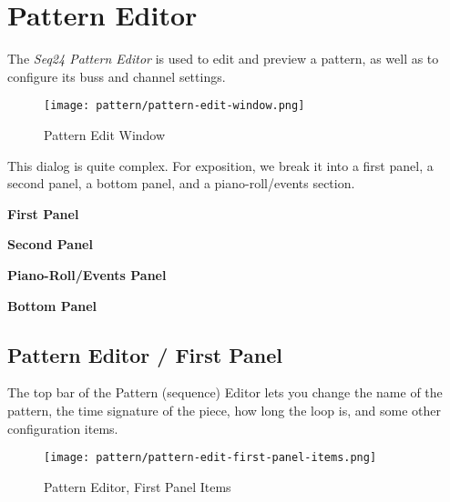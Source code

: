 %
%
%

\section{Pattern Editor}
\label{sec:seq24_pattern_editor}

   The \textsl{Seq24 Pattern Editor} is used to edit and preview a pattern,
   as well as to configure its buss and channel settings.

\begin{figure}[H]
   \centering 
   \texttt{[image: pattern/pattern-edit-window.png]}
   \caption{Pattern Edit Window}
   \label{fig:pattern_edit_window}
\end{figure}

   This dialog is quite complex.
   For exposition, we break it into a first panel, a second panel, a
   bottom panel, and a piano-roll/events section.

   \begin{enumber}
      \item \textbf{First Panel}
      \item \textbf{Second Panel}
      \item \textbf{Piano-Roll/Events Panel}
      \item \textbf{Bottom Panel}
   \end{enumber}

\subsection{Pattern Editor / First Panel}
\label{subsec:seq24_pattern_editor_first}

   The top bar of the Pattern (sequence) Editor lets you change the name of
   the pattern, the time signature of the piece, how long the loop is, and
   some other configuration items.

\begin{figure}[H]
   \centering 
   \texttt{[image: pattern/pattern-edit-first-panel-items.png]}
   \caption{Pattern Editor, First Panel Items}
   \label{fig:pattern_editor_first_panel_items}
\end{figure}


